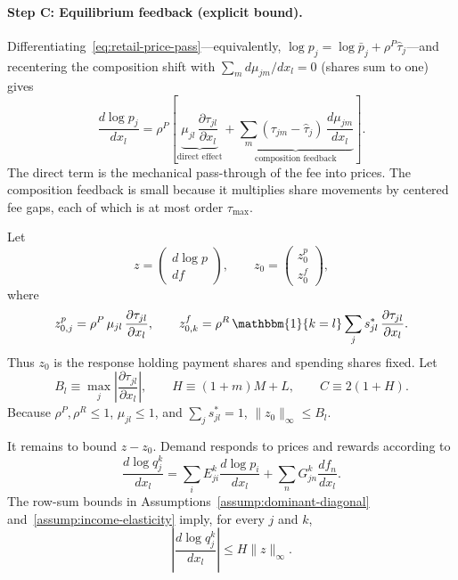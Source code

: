 \documentclass[main.tex]{subfiles}
\begin{document}
\paragraph{Step C: Equilibrium feedback (explicit bound).}
Differentiating~\eqref{eq:retail-price-pass}---equivalently, $\log p_j=\log\bar p_j+\rho^P\hat\tau_j$---and recentering the composition shift with $\sum_m d\mu_{jm}/dx_l=0$ (shares sum to one) gives
\begin{equation}
\frac{d\log p_j}{dx_l}=\rho^P\!\left[\underbrace{\mu_{jl}\,\frac{\partial\tau_{jl}}{\partial x_l}}_{\text{direct effect}}+\underbrace{\sum_m(\tau_{jm}-\hat\tau_j)\,\frac{d\mu_{jm}}{dx_l}}_{\text{composition feedback}}\right].
\label{eq:price-decomp}
\end{equation}
The direct term is the mechanical pass-through of the fee into prices.
The composition feedback is small because it multiplies share movements by centered fee gaps, each of which is at most order $\tau_{\max}$.

Let
\[
z=\begin{pmatrix}d\log p\\[2pt] df\end{pmatrix},\qquad
z_0=\begin{pmatrix}z^p_0\\[2pt] z^f_0\end{pmatrix},
\]
where
\[
z^{p}_{0,j}=\rho^P\,\mu_{jl}\,\frac{\partial\tau_{jl}}{\partial x_l},
\qquad
z^{f}_{0,k}=\rho^R\,\mathbbm{1}\{k=l\}\sum_j s^*_{jl}\,\frac{\partial\tau_{jl}}{\partial x_l}.
\]
Thus $z_0$ is the response holding payment shares and spending shares fixed.
Let
\begin{equation}
B_l\equiv\max_j\left|\frac{\partial\tau_{jl}}{\partial x_l}\right|,
\qquad
H\equiv(1+m)M+L,
\qquad
C\equiv2(1+H).
\label{eq:direct-effect}
\end{equation}
Because $\rho^P,\rho^R\leq1$, $\mu_{jl}\leq1$, and $\sum_j s^*_{jl}=1$, $\|z_0\|_\infty\leq B_l$.

It remains to bound $z-z_0$.
Demand responds to prices and rewards according to
\[
\frac{d\log q^k_j}{dx_l}
=\sum_i E^k_{ji}\frac{d\log p_i}{dx_l}
+\sum_n G^k_{jn}\frac{df_n}{dx_l}.
\]
The row-sum bounds in Assumptions~\ref{assump:dominant-diagonal} and~\ref{assump:income-elasticity} imply, for every $j$ and $k$,
\begin{equation}
\left|\frac{d\log q^k_j}{dx_l}\right|
\leq H\|z\|_\infty .
\label{eq:demand-response-bound}
\end{equation}
\end{document}
